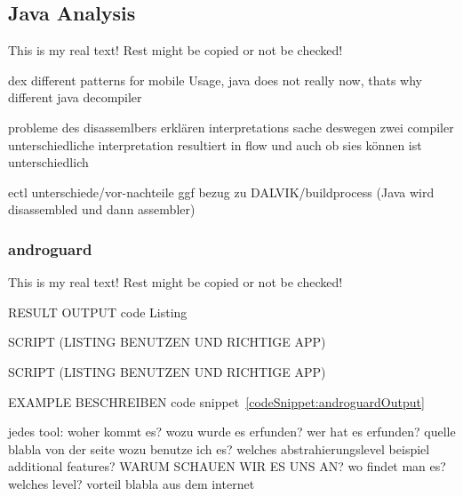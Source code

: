 \subsection{Java Analysis} \label{subsection:forensics-tools-java}
This is my real text! Rest might be copied or not be checked!

dex different patterns for mobile Usage, java does not really now, thats why different java decompiler


probleme des disassemlbers erklären\newline
interpretations sache\newline
deswegen zwei compiler\newline
unterschiedliche interpretation resultiert in flow und auch ob sies können ist unterschiedlich\newline

ectl unterschiede/vor-nachteile\newline
ggf bezug zu DALVIK/buildprocess (Java wird disassembled und dann assembler)\newline
\subsubsection{androguard} \label{subsection:forensics-tools-java-androguard}
This is my real text! Rest might be copied or not be checked!

%


RESULT OUTPUT
code Listing

SCRIPT (LISTING BENUTZEN UND RICHTIGE APP)

SCRIPT (LISTING BENUTZEN UND RICHTIGE APP)

EXAMPLE BESCHREIBEN code snippet~\ref{codeSnippet:androguardOutput}


jedes tool:\newline
woher kommt es?\newline
wozu wurde es erfunden?\newline
wer hat es erfunden? quelle\newline
blabla von der seite\newline
wozu benutze ich es?\newline
welches abstrahierungslevel\newline
beispiel\newline
additional features?\newline
WARUM SCHAUEN WIR ES UNS AN?\newline
wo findet man es?\newline
welches level?\newline
vorteil\newline
blabla aus dem internet\newline
